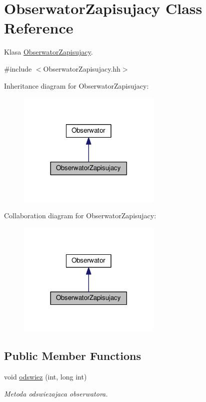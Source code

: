 \hypertarget{a00014}{}\section{Obserwator\+Zapisujacy Class Reference}
\label{a00014}


Klasa \hyperlink{a00014}{Obserwator\+Zapisujacy}.  




{\ttfamily \#include $<$Obserwator\+Zapisujacy.\+hh$>$}



Inheritance diagram for Obserwator\+Zapisujacy\+:
\nopagebreak
\begin{figure}[H]
\begin{center}
\leavevmode
\includegraphics[width=194pt]{a00139}
\end{center}
\end{figure}


Collaboration diagram for Obserwator\+Zapisujacy\+:
\nopagebreak
\begin{figure}[H]
\begin{center}
\leavevmode
\includegraphics[width=194pt]{a00140}
\end{center}
\end{figure}
\subsection*{Public Member Functions}
\begin{DoxyCompactItemize}
\item 
void \hyperlink{a00014_ace7d819c70329e85b06a5450f6f7c92f}{odswiez} (int, long int)
\begin{DoxyCompactList}\small\item\em Metoda odswiezajaca obserwatora. \end{DoxyCompactList}\end{DoxyCompactItemize}



